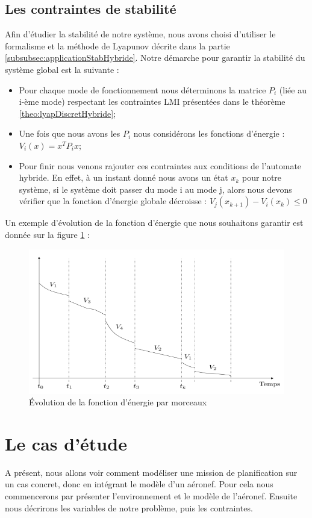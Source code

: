 \subsection{Les contraintes de stabilité}
\label{subsection:contrainteStabilite}
Afin d'étudier la stabilité de notre système, nous avons choisi d'utiliser le formalisme et la méthode de Lyapunov décrite dans la partie \ref{subsubsec:applicationStabHybride}. Notre démarche pour garantir la stabilité du système global est la suivante : 
\begin{itemize}
	\item Pour chaque mode de fonctionnement nous déterminons la matrice $P_i$ (liée au i-ème mode) respectant les contraintes LMI présentées dans le théorème \ref{theo:lyapDiscretHybride};
	\item Une fois que nous avons les $P_i$ nous considérons les fonctions d'énergie : $V_i(x) = x^TP_ix$;
	\item Pour finir nous venons rajouter ces contraintes aux conditions de l'automate hybride. En effet, à un instant donné nous avons un état $x_k$ pour notre système, si le système doit passer du mode i au mode j, alors nous devons vérifier que la fonction d'énergie globale décroisse : $V_j(x_{k+1})-V_i(x_k) \leq 0$
\end{itemize}
Un exemple d'évolution de la fonction d'énergie que nous souhaitons garantir est donnée sur la figure \ref{fig:decroissance} :
\begin{figure}[h]
	\centering	
	\includegraphics[scale=0.4]{images/decroissance.png}
	\caption{Évolution de la fonction d'énergie par morceaux}
	\label{fig:decroissance}
\end{figure}
\section{Le cas d'étude}
A présent, nous allons voir comment modéliser une mission de planification sur un cas concret, donc en intégrant le modèle d'un aéronef. Pour cela nous commencerons par présenter l'environnement et le modèle de l'aéronef. Ensuite nous décrirons les variables de notre problème, puis les contraintes.
